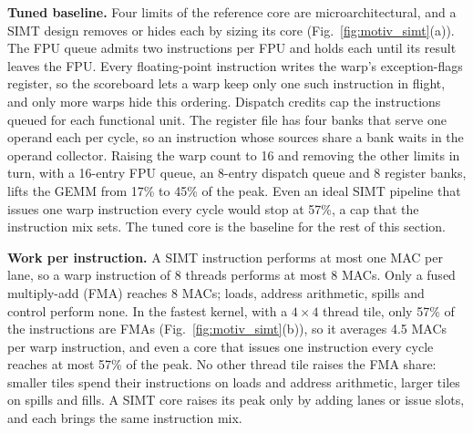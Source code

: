 \textbf{Tuned baseline.} Four limits of the reference core are microarchitectural, and a SIMT design removes or hides each by sizing its core (Fig.~\ref{fig:motiv_simt}(a)). The FPU queue admits two instructions per FPU and holds each until its result leaves the FPU. Every floating-point instruction writes the warp's exception-flags register, so the scoreboard lets a warp keep only one such instruction in flight, and only more warps hide this ordering. Dispatch credits cap the instructions queued for each functional unit. The register file has four banks that serve one operand each per cycle, so an instruction whose sources share a bank waits in the operand collector. Raising the warp count to 16 and removing the other limits in turn, with a 16-entry FPU queue, an 8-entry dispatch queue and 8 register banks, lifts the GEMM from 17\% to 45\% of the peak. Even an ideal SIMT pipeline that issues one warp instruction every cycle would stop at 57\%, a cap that the instruction mix sets. The tuned core is the baseline for the rest of this section.

\textbf{Work per instruction.} A SIMT instruction performs at most one MAC per lane, so a warp instruction of 8 threads performs at most 8 MACs. Only a fused multiply-add (FMA) reaches 8 MACs; loads, address arithmetic, spills and control perform none. In the fastest kernel, with a $4{\times}4$ thread tile, only 57\% of the instructions are FMAs (Fig.~\ref{fig:motiv_simt}(b)), so it averages 4.5 MACs per warp instruction, and even a core that issues one instruction every cycle reaches at most 57\% of the peak. No other thread tile raises the FMA share: smaller tiles spend their instructions on loads and address arithmetic, larger tiles on spills and fills. A SIMT core raises its peak only by adding lanes or issue slots, and each brings the same instruction mix.

